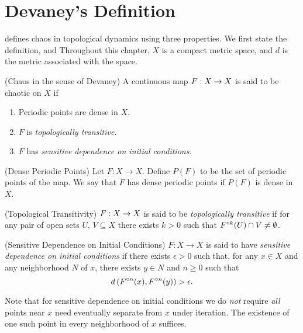 \documentclass[12pt,draft,twoside]{book}
\begin{document}
\chapter{Devaney's Definition}
\label{chap:devaney}
\citet{devaney} defines chaos in topological dynamics using three properties.
We first state the definition, and 
Throughout this chapter, $X$ is a compact metric space, and $d$ is the metric associated with the space.
\begin{definition}
  (Chaos in the sense of Devaney) 
  A continuous map $F: X\rightarrow X$ is said to be chaotic on $X$ if
  \begin{enumerate}
    \item Periodic points are dense in $X$.
    \item $F$ is \textit{topologically transitive}.
    \item $F$ has \textit{sensitive dependence on initial conditions}.
  \end{enumerate}
\end{definition}
%
\begin{definition}
  (Dense Periodic Points) 
  Let $F: X \to X$.
  Define $P(F)$ to be the set of periodic points of the map.
  We say that $F$ has dense periodic points if $P(F)$ is dense in $X$.
\end{definition}
%
\begin{definition}
  (Topological Transitivity) 
  $F: X \rightarrow X$ is said to be \textit{topologically transitive} if for any pair of open sets $U$, $V \subseteq X$ there exists $k > 0$ such that $F^{\circ k}(U) \cap V \neq \emptyset$.
  \label{defn:transitivity}
\end{definition}
%
\begin{definition}
  (Sensitive Dependence on Initial Conditions) 
  $F: X \rightarrow X$ is said to have \textit{sensitive dependence on initial conditions} if there exists $\epsilon > 0$ such that, for any $x \in X$ and any neighborhood $N$ of $x$, there exists $y\in N$ and $n\geq 0$ such that 
  \begin{equation*}
    d\left( F^{\circ n}(x), F^{\circ n}(y) \right) > \epsilon.
  \end{equation*}
  \label{defn:sdic}
\end{definition}
%
\noindent Note that for sensitive dependence on initial conditions we do \textit{not} require \textit{all} points near $x$ need eventually separate from $x$ under iteration.
The existence of one such point in every neighborhood of $x$ suffices.
\end{document}
